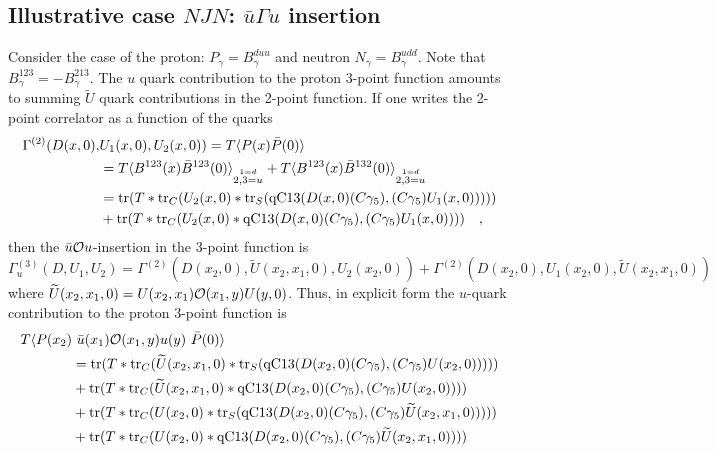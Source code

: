 \documentclass[12pt]{article}
\begin{document}
\subsection{Illustrative case $N J N$: $\bar{u}\Gamma u$ insertion}
Consider the case of the proton: $P_\gamma = B^{duu}_\gamma$ and neutron
$N_\gamma = B^{udd}_\gamma$. Note that $B^{123}_\gamma = -B^{213}_\gamma$.
The $u$ quark contribution to the proton 3-point function amounts to
summing $\widetilde{U}$ quark contributions in the 2-point function.
If one writes the 2-point correlator as a function of the quarks
%
\begin{gather*}
\begin{split}
\Gamma^{(2)}(D(x,0),&U_1(x,0),U_2(x,0)) = T  \langle P(x) \bar{P}(0)\rangle \\
 &= T \langle B^{123}(x) \bar{B}^{123}(0)\rangle_{\stackrel{1=d}{2,3=u}}
  + T \langle B^{123}(x) \bar{B}^{132}(0)\rangle_{\stackrel{1=d}{2,3=u}}\\
 &= {\rm tr}(T * {\rm tr}_C(U_2(x,0)
  * {\rm tr}_S({\rm qC13}(D(x,0)(C\gamma_5),(C\gamma_5)U_1(x,0)))))\\
 &+ {\rm tr}(T * {\rm tr}_C(U_2(x,0)
 * {\rm qC13}(D(x,0)(C\gamma_5),(C\gamma_5)U_1(x,0))))\quad,
\end{split}
\end{gather*}
then the $\bar{u}{\cal O}u$-insertion in the 3-point function is
\[
\Gamma^{(3)}_u(D,U_1,U_2) = \Gamma^{(2)}(D(x_2,0),\widetilde{U}(x_2,x_1,0),U_2(x_2,0))
 +  \Gamma^{(2)}(D(x_2,0),U_1(x_2,0),\widetilde{U}(x_2,x_1,0))
\]
where $\widetilde{U}(x_2,x_1,0) = U(x_2,x_1) {\cal O}(x_1,y) U(y,0)$.
Thus, in explicit form the $u$-quark contribution to the proton 3-point
function is
%
\begin{gather*}
\begin{split}
T  \langle P(x_2) &\ \bar{u}(x_1){\cal O}(x_1,y) u(y)\ \bar{P}(0)\rangle\\
 &= {\rm tr}(T * {\rm tr}_C(\widetilde{U}(x_2,x_1,0)
  * {\rm tr}_S({\rm qC13}(D(x_2,0)(C\gamma_5),(C\gamma_5)U(x_2,0)))))\\
 &+ {\rm tr}(T * {\rm tr}_C(\widetilde{U}(x_2,x_1,0)
 * {\rm qC13}(D(x_2,0)(C\gamma_5),(C\gamma_5)U(x_2,0)))) \\
 &+ {\rm tr}(T * {\rm tr}_C(U(x_2,0)
  * {\rm tr}_S({\rm qC13}(D(x_2,0)(C\gamma_5),(C\gamma_5)\widetilde{U}(x_2,x_1,0)))))\\
 &+ {\rm tr}(T * {\rm tr}_C(U(x_2,0)
 * {\rm qC13}(D(x_2,0)(C\gamma_5),(C\gamma_5)\widetilde{U}(x_2,x_1,0))))
\end{split}
\end{gather*}
\end{document}
